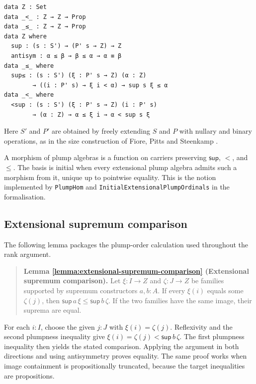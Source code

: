 \documentclass[runningheads]{llncs}
\begin{document}
\begin{listing}[ht]
\begin{Verbatim}[frame=single,breaklines=true,fontsize=\scriptsize]
data Z : Set
data _<_ : Z → Z → Prop
data _≤_ : Z → Z → Prop
data Z where
  sup : (s : S') → (P' s → Z) → Z
  antisym : α ≤ β → β ≤ α → α ≡ β
data _≤_ where
  sup≤ : (s : S') (ξ : P' s → Z) (α : Z)
        → ((i : P' s) → ξ i < α) → sup s ξ ≤ α
data _<_ where
  <sup : (s : S') (ξ : P' s → Z) (i : P' s)
        → (α : Z) → α ≤ ξ i → α < sup s ξ
\end{Verbatim}
\caption{The extensional plump ordinal basis}
\end{listing}

Here \(S'\) and \(P'\) are obtained by freely extending \(S\) and \(P\)
with nullary and binary operations, as in the size construction of Fiore,
Pitts and Steenkamp \citep{fiore2022-quotient-inductive}.

A morphism of plump algebras is a function on carriers preserving
\(\mathsf{sup}\), \(<\), and \(\leq\). The basis is initial when every
extensional plump algebra admits such a morphism from it, unique up to
pointwise equality. This is the notion implemented by
\texttt{PlumpHom} and \texttt{InitialExtensionalPlumpOrdinals} in the
formalisation.

\subsection{Extensional supremum
comparison}\label{extensional-supremum-comparison}

The following lemma packages the plump-order calculation used throughout
the rank argument.

\begin{quote}
\textbf{Lemma \ref{lemma:extensional-supremum-comparison} (Extensional supremum comparison).}\label{lemma:extensional-supremum-comparison} Let \(\xi:I\to Z\)
and \(\zeta:J\to Z\) be families supported by supremum constructors
\(a,b:A\). If every \(\xi (i)\) equals some \(\zeta (j)\), then
\(\mathsf{sup}\, a\,\xi\leq\mathsf{sup}\, b\,\zeta\). If the two families
have the same image, their suprema are equal.
\end{quote}

For each \(i:I\), choose the given \(j:J\) with \(\xi (i)=\zeta (j)\).
Reflexivity and the second plumpness inequality give
\(\xi (i)=\zeta (j)<\mathsf{sup}\, b\,\zeta\). The first plumpness inequality
then yields the stated comparison. Applying the argument in both
directions and using antisymmetry proves equality. The same proof works
when image containment is propositionally truncated, because the target
inequalities are propositions.
\end{document}
